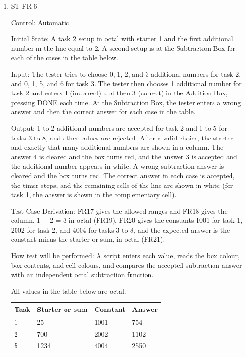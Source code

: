 \documentclass[12pt, titlepage]{article}
\begin{document}
\begin{enumerate}
How test will be performed: A script loads each fixed setup, selects the stored cells, and checks cell colours and counts. A second script generates 1,000 rounds and compares the target sets of all task pairs in each round.

\item{ST-FR-6\\}

Control: Automatic

Initial State: A task 2 setup in octal with starter 1 and the first additional number in the line equal to 2. A second setup is at the Subtraction Box for each of the cases in the table below.

Input: The tester tries to choose 0, 1, 2, and 3 additional numbers for task 2, and 0, 1, 5, and 6 for task 3. The tester then chooses 1 additional number for task 2 and enters 4 (incorrect) and then 3 (correct) in the Addition Box, pressing DONE each time. At the Subtraction Box, the tester enters a wrong answer and then the correct answer for each case in the table.

Output: 1 to 2 additional numbers are accepted for task 2 and 1 to 5 for tasks 3 to 8, and other values are rejected. After a valid choice, the starter and exactly that many additional numbers are shown in a column. The answer 4 is cleared and the box turns red, and the answer 3 is accepted and the additional number appears in white. A wrong subtraction answer is cleared and the box turns red. The correct answer in each case is accepted, the timer stops, and the remaining cells of the line are shown in white (for task 1, the answer is shown in the complementary cell).

Test Case Derivation: FR17 gives the allowed ranges and FR18 gives the column. 1 + 2 = 3 in octal (FR19). FR20 gives the constants 1001 for task 1, 2002 for task 2, and 4004 for tasks 3 to 8, and the expected answer is the constant minus the starter or sum, in octal (FR21).

How test will be performed: A script enters each value, reads the box colour, box contents, and cell colours, and compares the accepted subtraction answer with an independent octal subtraction function.

\noindent All values in the table below are octal.

\begin{center}
\begin{tabular}{llll}
\toprule
\textbf{Task} & \textbf{Starter or sum} & \textbf{Constant} & \textbf{Answer}\\
\midrule
1 & 25 & 1001 & 754\\
2 & 700 & 2002 & 1102\\
5 & 1234 & 4004 & 2550\\
\bottomrule
\end{tabular}
\end{center}


\end{enumerate}
\end{document}
